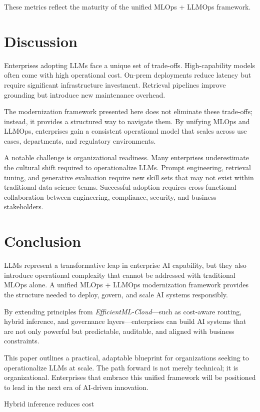 \documentclass[11pt]{article}
\begin{document}
These metrics reflect the maturity of the unified MLOps + LLMOps framework.

\section{Discussion}

Enterprises adopting LLMs face a unique set of trade-offs. High-capability models often come with high operational cost. On-prem deployments reduce latency but require significant infrastructure investment. Retrieval pipelines improve grounding but introduce new maintenance overhead.

The modernization framework presented here does not eliminate these trade-offs; instead, it provides a structured way to navigate them. By unifying MLOps and LLMOps, enterprises gain a consistent operational model that scales across use cases, departments, and regulatory environments.

A notable challenge is organizational readiness. Many enterprises underestimate the cultural shift required to operationalize LLMs. Prompt engineering, retrieval tuning, and generative evaluation require new skill sets that may not exist within traditional data science teams. Successful adoption requires cross-functional collaboration between engineering, compliance, security, and business stakeholders.

\section{Conclusion}

LLMs represent a transformative leap in enterprise AI capability, but they also introduce operational complexity that cannot be addressed with traditional MLOps alone. A unified MLOps + LLMOps modernization framework provides the structure needed to deploy, govern, and scale AI systems responsibly.

By extending principles from \textit{EfficientML-Cloud}—such as cost-aware routing, hybrid inference, and governance layers—enterprises can build AI systems that are not only powerful but predictable, auditable, and aligned with business constraints.

This paper outlines a practical, adaptable blueprint for organizations seeking to operationalize LLMs at scale. The path forward is not merely technical; it is organizational. Enterprises that embrace this unified framework will be positioned to lead in the next era of AI-driven innovation.






Hybrid inference reduces cost 
\cite{solan2026efficientmlcloud}
\cite{lewis2020rag}
\cite{chen2023llmops}
\cite{zhang2022governance}
\cite{openai2023bestpractices}
\cite{google2023embeddingdrift}


\end{document}
